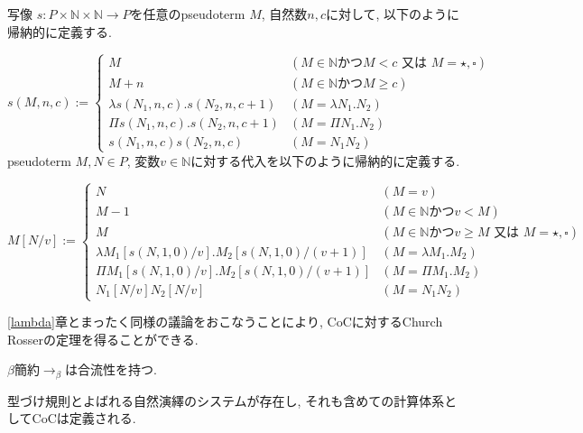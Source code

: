 \documentclass[12pt, titlepage]{ltjsarticle}
\begin{document}
\begin{defn}
 写像 $s \colon P \times \mathbb{N} \times \mathbb{N} \rightarrow P$を任意のpseudoterm $M$, 自然数$n, c$に対して, 以下のように帰納的に定義する.

\[
  s (M, n, c) := \begin{cases}
    M & (M \in \mathbb{N} \text{かつ} M < c \text{ 又は } M = \star, \square) \\
    M + n & (M \in \mathbb{N} \text{かつ} M \geq c) \\
    \lambda s (N_1, n, c). s (N_2, n, c + 1) & (M = \lambda N_1. N_2) \\
    \Pi s (N_1, n, c). s (N_2, n, c + 1) & (M = \Pi N_1. N_2) \\
    s (N_1, n, c) s (N_2, n, c) & (M = N_1 N_2)
  \end{cases}
\]
 pseudoterm $M, N \in P$, 変数$v \in \mathbb{N}$に対する代入を以下のように帰納的に定義する.

\[
 M[N/v] := \begin{cases}
    N & (M = v) \\
    M - 1 & (M \in \mathbb{N} \text{かつ} v < M) \\
    M & (M \in \mathbb{N} \text{かつ} v \geq M \text{ 又は } M = \star, \square) \\
    \lambda M_1 [s (N, 1, 0)/v]. M_2 [s (N, 1, 0)/(v + 1)] & (M = \lambda M_1. M_2) \\
    \Pi M_1 [s (N, 1, 0)/v]. M_2 [s (N, 1, 0)/(v + 1)] & (M = \Pi M_1. M_2) \\
    N_1[N/v] N_2[N/v] & (M = N_1 N_2)
  \end{cases}
\]
\end{defn}

\ref{lambda}章とまったく同様の議論をおこなうことにより, CoCに対するChurch Rosserの定理を得ることができる.

\begin{thm}
 $\beta$簡約$\rightarrow_{\beta}$は合流性を持つ.
\end{thm}

型づけ規則とよばれる自然演繹のシステムが存在し, それも含めての計算体系としてCoCは定義される.
\end{document}
